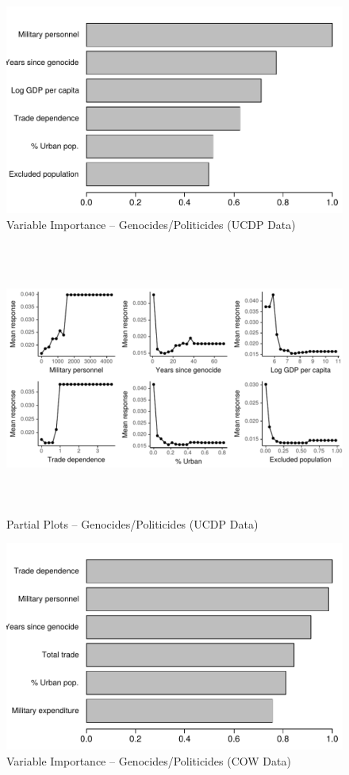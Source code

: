 \begin{figure}[H]
    \centering
    \includegraphics{images/drf-gp1.pdf}
    \caption{Variable Importance -- Genocides/Politicides (UCDP Data)}
    \label{fig:my_label}
\end{figure}

\begin{figure}[H]
    \centering
    \includegraphics[width=\textwidth, height=9cm]{images/drfdpp5a.pdf}
    \caption{Partial Plots -- Genocides/Politicides (UCDP Data)}
    \label{fig:my_label}
\end{figure}

\begin{figure}[H]
    \centering
    \includegraphics{images/drf-gp2.pdf}
    \caption{Variable Importance -- Genocides/Politicides (COW Data)}
    \label{fig:my_label}
\end{figure}


